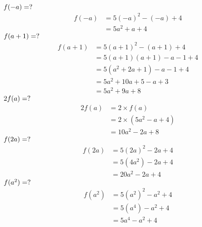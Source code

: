 \documentclass{article}
\begin{document}
\newline\newline
$f(-a) = \space ?$
\begin{equation}
\begin{split}
    f(-a) & = 5(-a)^2 - (-a) + 4 \\
    & = 5a^2 + a + 4
\end{split}
\end{equation}
\newline\newline
$f(a + 1) = \space ?$
\begin{equation}
\begin{split}
    f(a + 1) & = 5(a + 1)^2 - (a + 1) + 4 \\
    & = 5 (a + 1)(a + 1) - a - 1 + 4 \\
    & = 5(a^2 + 2a + 1) - a - 1 + 4 \\
    & = 5a^2 + 10a + 5 -a + 3 \\
    & = 5a^2 + 9a + 8
\end{split}
\end{equation}
\newline\newline
$2f(a) = \space ?$
\begin{equation}
\begin{split}
    2f(a) & = 2\times f(a) \\
    & = 2 \times (5a^2 - a + 4) \\
    & = 10a^2 - 2a + 8    
\end{split}
\end{equation}
\newline\newline
$f(2a) = \space ?$
\begin{equation}
\begin{split}
    f(2a) & = 5(2a)^2 - 2a + 4 \\
    & = 5(4a^2) - 2a + 4 \\
    & = 20a^2 -2a + 4     
\end{split}
\end{equation}
\newline\newline
$f(a^2) = \space ?$
\begin{equation}
\begin{split}
    f(a^2) & = 5(a^2)^2 - a^2 + 4 \\
    & = 5(a^4) - a^2 + 4 \\
    & = 5a^4 - a^2 + 4     
\end{split}
\end{equation}
\end{document}
